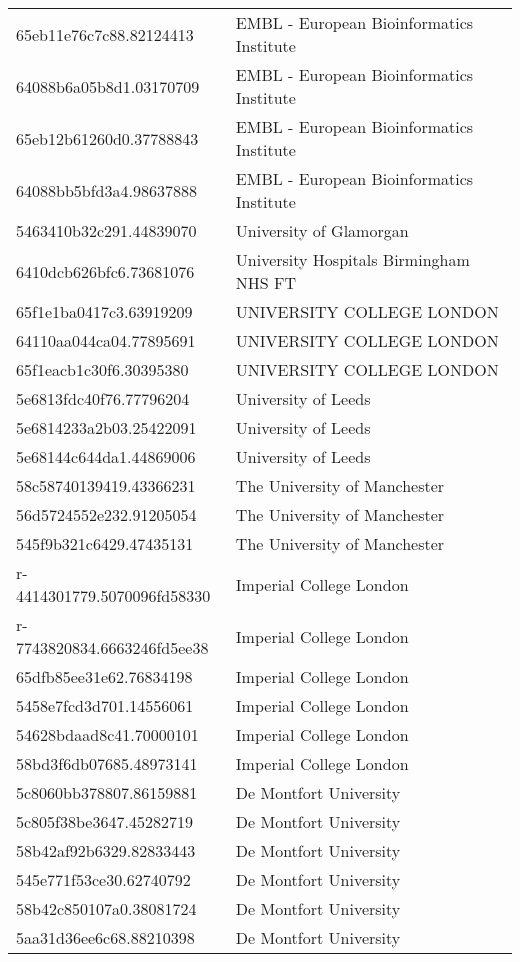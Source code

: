 \begin{tabular}{ll}
65eb11e76c7c88.82124413 & EMBL - European Bioinformatics Institute \\
64088b6a05b8d1.03170709 & EMBL - European Bioinformatics Institute \\
65eb12b61260d0.37788843 & EMBL - European Bioinformatics Institute \\
64088bb5bfd3a4.98637888 & EMBL - European Bioinformatics Institute \\
5463410b32c291.44839070 & University of Glamorgan \\
6410dcb626bfc6.73681076 & University Hospitals Birmingham NHS FT \\
65f1e1ba0417c3.63919209 & UNIVERSITY COLLEGE LONDON \\
64110aa044ca04.77895691 & UNIVERSITY COLLEGE LONDON \\
65f1eacb1c30f6.30395380 & UNIVERSITY COLLEGE LONDON \\
5e6813fdc40f76.77796204 & University of Leeds \\
5e6814233a2b03.25422091 & University of Leeds \\
5e68144c644da1.44869006 & University of Leeds \\
58c58740139419.43366231 & The University of Manchester \\
56d5724552e232.91205054 & The University of Manchester \\
545f9b321c6429.47435131 & The University of Manchester \\
r-4414301779.5070096fd58330 & Imperial College London \\
r-7743820834.6663246fd5ee38 & Imperial College London \\
65dfb85ee31e62.76834198 & Imperial College London \\
5458e7fcd3d701.14556061 & Imperial College London \\
54628bdaad8c41.70000101 & Imperial College London \\
58bd3f6db07685.48973141 & Imperial College London \\
5c8060bb378807.86159881 & De Montfort University \\
5c805f38be3647.45282719 & De Montfort University \\
58b42af92b6329.82833443 & De Montfort University \\
545e771f53ce30.62740792 & De Montfort University \\
58b42c850107a0.38081724 & De Montfort University \\
5aa31d36ee6c68.88210398 & De Montfort University \\

\end{tabular}
